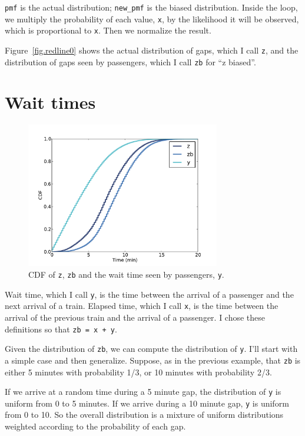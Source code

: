 \documentclass[12pt]{book}
\begin{document}
{\tt pmf} is the actual distribution; \verb"new_pmf" is the
biased distribution.  Inside the loop, we multiply the
probability of each value, {\tt x}, by the likelihood it will
be observed, which is proportional to {\tt x}.  Then we
normalize the result.

Figure~\ref{fig.redline0} shows the actual distribution of gaps, which
I call {\tt z}, and the distribution of gaps seen by passengers,
which I call {\tt zb} for ``z biased''.  


\section{Wait times}

\begin{figure}
\centerline{\includegraphics[height=2.5in]{figs/redline2.pdf}}
\caption{CDF of {\tt z}, {\tt zb} and the wait time seen
by passengers, {\tt y}. }
\label{fig.redline2}
\end{figure}

Wait time, which I call {\tt y}, is the time between the arrival
of a passenger and the next arrival of a train.  Elapsed time, which I
call {\tt x}, is the time between the arrival of the previous
train and the arrival of a passenger.  I chose these definitions
so that {\tt zb = x + y}.

Given the distribution of {\tt zb}, we can compute the distribution of
{\tt y}.  I'll start with a simple case and then generalize.
Suppose, as in the previous example, that {\tt zb} is either 5 minutes
with probability 1/3, or 10 minutes with probability 2/3.

If we arrive at a random time during a 5 minute gap, the distribution
of {\tt y} is uniform from 0 to 5 minutes.  If we arrive during a 10
minute gap, {\tt y} is uniform from 0 to 10.  So the overall
distribution is a mixture of uniform distributions weighted
according to the probability of each gap.
\end{document}
